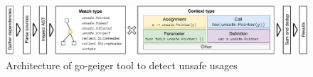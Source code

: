 \begin{figure}[htp!]
    \centering
    \includegraphics[width=\textwidth]{assets/figures/chapter4/go-geiger-architecture.pdf}
    \caption{Architecture of go-geiger tool to detect unsafe usages}
    \label{fig:geiger-architecture}
\end{figure}
